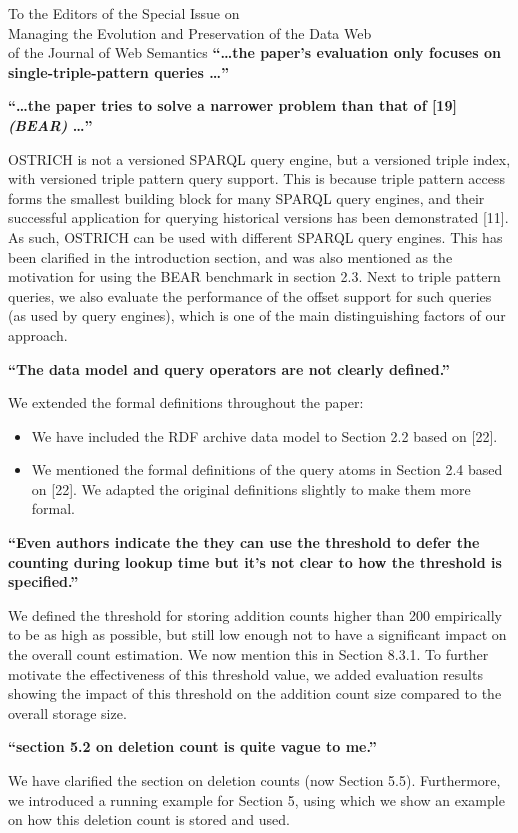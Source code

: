 \documentclass{letter}
\newcounter{section}
\begin{document}
\begin{letter}{To the Editors of the Special Issue on\\Managing the Evolution and Preservation of the Data Web\\of the Journal of Web Semantics}
\textbf{\enquote{\ldots the paper's evaluation only focuses on single-triple-pattern queries \ldots}}

\textbf{\enquote{\ldots the paper tries to solve a narrower problem than that of [19] \emph{(BEAR)} \ldots}}

OSTRICH is not a versioned SPARQL query engine, but a versioned triple index,
with versioned triple pattern query support.
This is because triple pattern access forms the smallest building block for many SPARQL query engines,
and their successful application for querying historical versions has been demonstrated [11].
As such, OSTRICH can be used with different SPARQL query engines.
This has been clarified in the introduction section, and was also mentioned as the motivation for using the BEAR benchmark in section 2.3.
Next to triple pattern queries,
we also evaluate the performance of the offset support for such queries
(as used by query engines),
which is one of the main distinguishing factors of our approach.

\textbf{\enquote{The data model and query operators are not clearly defined.}}

We extended the formal definitions throughout the paper:
\begin{itemize}
    \item We have included the RDF archive data model to Section 2.2 based on [22].
    \item We mentioned the formal definitions of the query atoms in Section 2.4 based on [22]. We adapted the original definitions slightly to make them more formal.
\end{itemize}

\textbf{\enquote{Even authors indicate the they can use the threshold to defer the counting during lookup time but it's not clear to how the threshold is specified.}}

We defined the threshold for storing addition counts higher than 200 empirically to be as high as possible,
but still low enough not to have a significant impact on the overall count estimation.
We now mention this in Section 8.3.1.
To further motivate the effectiveness of this threshold value,
we added evaluation results showing the impact of this threshold on the addition count size compared to the overall storage size.

\textbf{\enquote{section 5.2 on deletion count is quite vague to me.}}

We have clarified the section on deletion counts (now Section 5.5).
Furthermore, we introduced a running example for Section 5,
using which we show an example on how this deletion count is stored and used.


\end{letter}
\end{document}
